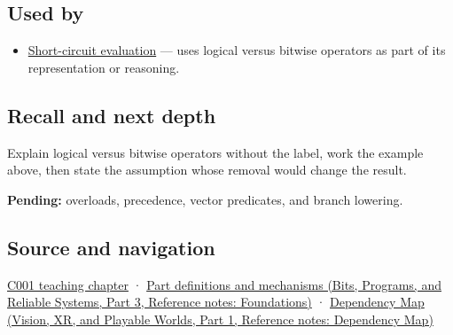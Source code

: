 \subsection{Used by}\label{appendix-fe6b457d68d8-used-by}

\hypertarget{appendix-fe6b457d68d8-used-by}{}

\begin{itemize}
\tightlist
\item
  \hyperref[appendix-2e245a6fa8d3]{Short-circuit evaluation} --- uses logical versus bitwise operators as part of its representation or reasoning.
\end{itemize}

\subsection{Recall and next depth}\label{appendix-fe6b457d68d8-recall-and-next-depth}

\hypertarget{appendix-fe6b457d68d8-recall-and-next-depth}{}

Explain logical versus bitwise operators without the label, work the example above, then state the assumption whose removal would change the result.

\textbf{Pending:} overloads, precedence, vector predicates, and branch lowering.

\subsection{Source and navigation}\label{appendix-fe6b457d68d8-source-and-navigation}

\hypertarget{appendix-fe6b457d68d8-source-and-navigation}{}

\hyperref[01-foundations-i-ch001-from-a-signal-to-an-interpretation]{C001 teaching chapter} · \href{../01-Bits-Programs-and-Reliable-Systems-P03/main.pdf\#appendix-fd090d982a15}{Part definitions and mechanisms (Bits, Programs, and Reliable Systems, Part 3, Reference notes: Foundations)} · \href{../07-Vision-XR-and-Playable-Worlds-P01/main.pdf\#appendix-4ad47bdd269a}{Dependency Map (Vision, XR, and Playable Worlds, Part 1, Reference notes: Dependency Map)}
